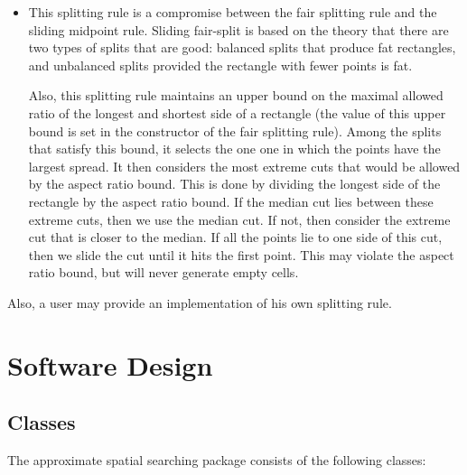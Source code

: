 \begin{itemize}
\item {}

This splitting rule is a compromise between the fair splitting rule
and the sliding midpoint rule.
Sliding fair-split is based on the theory that there are
two types of splits that are good: balanced splits that
produce fat rectangles, and unbalanced splits provided
the rectangle with fewer points is fat.

Also, this splitting rule maintains an upper
bound on the maximal allowed ratio of the longest and shortest side of
a rectangle (the value of this upper bound is set in the constructor of the
fair splitting rule). Among the splits that satisfy this bound, it selects
the one one in which the points have the largest spread.
It then considers the most extreme cuts that would be allowed by the
aspect ratio bound. This is done by dividing the longest side of
the rectangle by the aspect ratio bound. If the median cut lies
between these extreme cuts, then we use the median cut. If not,
then consider the extreme cut that is closer to the median.
If all the points lie to one side of this cut, then we slide the cut
until it hits the first point.
This may violate the aspect ratio bound, but will never generate empty cells.

\end{itemize}

Also, a user may provide an implementation of his own
splitting rule.

\section{Software Design}

\subsection{Classes}

The approximate spatial searching package consists of the following classes:

